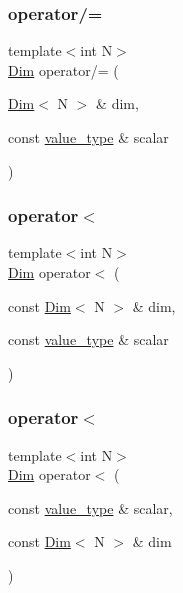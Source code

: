 \subsubsection{\texorpdfstring{operator/=}{operator/=}}
{\footnotesize\ttfamily template$<$int N$>$ \\
\hyperlink{structbc_1_1Dim}{Dim} operator/= (\begin{DoxyParamCaption}\item[{\hyperlink{structbc_1_1Dim}{Dim}$<$ N $>$ \&}]{dim,  }\item[{const \hyperlink{structbc_1_1Dim_af59ff554825273cf6bd9619b2c78c196}{value\+\_\+type} \&}]{scalar }\end{DoxyParamCaption})\hspace{0.3cm}{\ttfamily [friend]}}

\mbox{\label{structbc_1_1Dim_afac3cc12ef632a20ac478a7b3fd9d06d}} 
\subsubsection{\texorpdfstring{operator$<$}{operator<}\hspace{0.1cm}{\footnotesize\ttfamily [1/2]}}
{\footnotesize\ttfamily template$<$int N$>$ \\
\hyperlink{structbc_1_1Dim}{Dim} operator$<$ (\begin{DoxyParamCaption}\item[{const \hyperlink{structbc_1_1Dim}{Dim}$<$ N $>$ \&}]{dim,  }\item[{const \hyperlink{structbc_1_1Dim_af59ff554825273cf6bd9619b2c78c196}{value\+\_\+type} \&}]{scalar }\end{DoxyParamCaption})\hspace{0.3cm}{\ttfamily [friend]}}

\mbox{\label{structbc_1_1Dim_aee5974efe89f586c7206f0b6a72f365b}} 
\subsubsection{\texorpdfstring{operator$<$}{operator<}\hspace{0.1cm}{\footnotesize\ttfamily [2/2]}}
{\footnotesize\ttfamily template$<$int N$>$ \\
\hyperlink{structbc_1_1Dim}{Dim} operator$<$ (\begin{DoxyParamCaption}\item[{const \hyperlink{structbc_1_1Dim_af59ff554825273cf6bd9619b2c78c196}{value\+\_\+type} \&}]{scalar,  }\item[{const \hyperlink{structbc_1_1Dim}{Dim}$<$ N $>$ \&}]{dim }\end{DoxyParamCaption})\hspace{0.3cm}{\ttfamily [friend]}}

